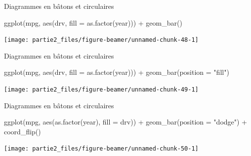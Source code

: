 \documentclass[12pt,ignorenonframetext,]{beamer}
\newenvironment{Shaded}{}{}
\newcommand{\DataTypeTok}[1]{#1}
\newcommand{\KeywordTok}[1]{\textcolor[rgb]{0.00,0.00,1.00}{#1}}
\newcommand{\NormalTok}[1]{#1}
\newcommand{\OperatorTok}[1]{#1}
\newcommand{\StringTok}[1]{\textcolor[rgb]{0.00,0.50,0.50}{#1}}
\renewenvironment{Shaded}{\begin{snugshade}}{\end{snugshade}}
\begin{document}
\begin{frame}[fragile]{Diagrammes en bâtons et circulaires}
\protect\hypertarget{diagrammes-en-batons-et-circulaires-8}{}

\footnotesize \center

\begin{Shaded}
\begin{Highlighting}[]
\KeywordTok{ggplot}\NormalTok{(mpg, }\KeywordTok{aes}\NormalTok{(drv, }\DataTypeTok{fill =} \KeywordTok{as.factor}\NormalTok{(year))) }\OperatorTok{+}\StringTok{ }
\StringTok{  }\KeywordTok{geom_bar}\NormalTok{()}
\end{Highlighting}
\end{Shaded}

\texttt{[image: partie2\_files/figure-beamer/unnamed-chunk-48-1]}

\end{frame}

\begin{frame}[fragile]{Diagrammes en bâtons et circulaires}
\protect\hypertarget{diagrammes-en-batons-et-circulaires-9}{}

\footnotesize \center

\begin{Shaded}
\begin{Highlighting}[]
\KeywordTok{ggplot}\NormalTok{(mpg, }\KeywordTok{aes}\NormalTok{(drv, }\DataTypeTok{fill =} \KeywordTok{as.factor}\NormalTok{(year))) }\OperatorTok{+}\StringTok{ }
\StringTok{  }\KeywordTok{geom_bar}\NormalTok{(}\DataTypeTok{position =} \StringTok{"fill"}\NormalTok{)}
\end{Highlighting}
\end{Shaded}

\texttt{[image: partie2\_files/figure-beamer/unnamed-chunk-49-1]}

\end{frame}

\begin{frame}[fragile]{Diagrammes en bâtons et circulaires}
\protect\hypertarget{diagrammes-en-batons-et-circulaires-10}{}

\footnotesize \center

\begin{Shaded}
\begin{Highlighting}[]
\KeywordTok{ggplot}\NormalTok{(mpg, }\KeywordTok{aes}\NormalTok{(}\KeywordTok{as.factor}\NormalTok{(year), }\DataTypeTok{fill =}\NormalTok{ drv)) }\OperatorTok{+}\StringTok{ }
\StringTok{  }\KeywordTok{geom_bar}\NormalTok{(}\DataTypeTok{position =} \StringTok{"dodge"}\NormalTok{) }\OperatorTok{+}\StringTok{ }
\StringTok{  }\KeywordTok{coord_flip}\NormalTok{()}
\end{Highlighting}
\end{Shaded}

\texttt{[image: partie2\_files/figure-beamer/unnamed-chunk-50-1]}

\end{frame}
\end{document}
